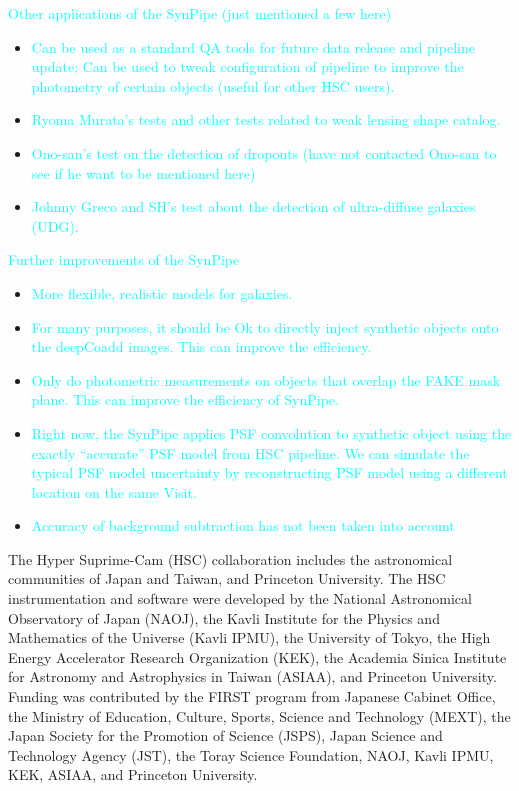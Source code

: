 \documentclass[preprint]{aastex}
\newcommand{\plan}[1]{\textcolor{cyan}{#1}}
\begin{document}
    \plan{Other applications of the SynPipe (just mentioned a few here)}
    \begin{itemize}
        \item \plan{Can be used as a standard QA tools for future data release and 
                    pipeline update;  Can be used to tweak configuration of pipeline
                    to improve the photometry of certain objects (useful for 
                    other HSC users).}
        \item \plan{Ryoma Murata's tests and other tests related to weak lensing shape 
                    catalog.}
        \item \plan{Ono-san's test on the detection of dropouts (have not contacted 
                    Ono-san to see if he want to be mentioned here)}
        \item \plan{Johnny Greco and SH's test about the detection of ultra-diffuse 
                    galaxies (UDG).}
    \end{itemize}

    \plan{Further improvements of the SynPipe}
    \begin{itemize}
        \item \plan{More flexible, realistic models for galaxies.}
        \item \plan{For many purposes, it should be Ok to directly inject synthetic 
                    objects onto the deepCoadd images. 
                    This can improve the efficiency.}
        \item \plan{Only do photometric measurements on objects that overlap the FAKE
                    mask plane.  This can improve the efficiency of SynPipe.}
        \item \plan{Right now, the SynPipe applies PSF convolution to synthetic object 
                    using the exactly ``accurate'' PSF model from HSC pipeline. 
                    We can simulate the typical PSF model uncertainty by reconstructing 
                    PSF model using a different location on the same Visit.}
        \item \plan{Accuracy of background subtraction has not been taken into account}
    \end{itemize}

  
\acknowledgements{}
  The Hyper Suprime-Cam (HSC) collaboration includes the astronomical communities of Japan
  and Taiwan, and Princeton University.  The HSC instrumentation and software were
  developed by the National Astronomical Observatory of Japan (NAOJ), the Kavli Institute
  for the Physics and Mathematics of the Universe (Kavli IPMU), the University of Tokyo,
  the High Energy Accelerator Research Organization (KEK), the Academia Sinica Institute
  for Astronomy and Astrophysics in Taiwan (ASIAA), and Princeton University.  Funding was
  contributed by the FIRST program from Japanese Cabinet Office, the Ministry of
  Education, Culture, Sports, Science and Technology (MEXT), the Japan Society for the
  Promotion of Science (JSPS),  Japan Science and Technology Agency (JST),  the Toray
  Science  Foundation, NAOJ, Kavli IPMU, KEK, ASIAA, and Princeton University.
   
\end{document}
